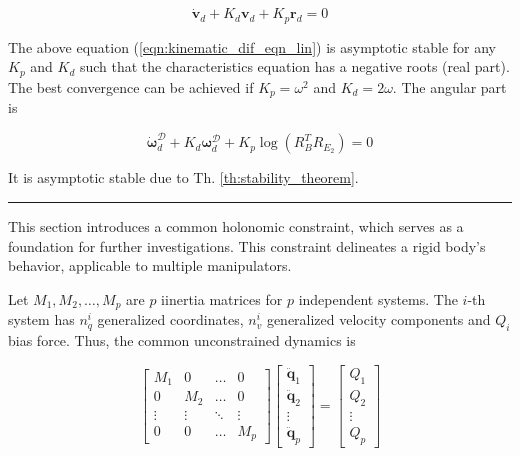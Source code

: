 \begin{equation}
    \dot{\mathbf{v}}_d + K_d \mathbf{v}_d + K_p \mathbf{r}_d = 0
    \label{eqn:kinematic_dif_eqn_lin}
\end{equation}

The above equation (\ref{eqn:kinematic_dif_eqn_lin}) is asymptotic stable for any 
$K_p$ and $K_d$ such that the characteristics equation has a negative roots 
(real part). The best convergence can be achieved if $K_p = \omega^2$ and 
$K_d = 2 \omega$. The angular part is 

\begin{equation}
    \dot{\boldsymbol{\omega}}_d^{\mathcal{D}} + 
    K_d \boldsymbol{\omega}_d^{\mathcal{D}} + 
    K_p \log (R_B^T R_{E_2}) = 0
    \label{eqn:kinematic_dif_eqn_ang}
\end{equation}

It is asymptotic stable due to Th. \ref{th:stability_theorem}.

\noindent\rule{\textwidth}{1pt}

This section introduces a common holonomic constraint, which serves as a foundation 
for further investigations. This constraint delineates a rigid body's behavior, 
applicable to multiple manipulators.

Let $M_1, M_2, \dots, M_p$ are $p$ iinertia matrices for $p$ independent systems. 
The $i$-th system has $n_q^i$ generalized coordinates, $n_v^i$ generalized velocity 
components and $Q_i$ bias force. Thus, the common unconstrained dynamics is

\begin{equation}
    \label{eqn:common_dynamics}
    \begin{bmatrix}
        M_1 & 0   & \dots & 0 \\
        0   & M_2 & \dots & 0 \\
        \vdots & \vdots & \ddots & \vdots \\
        0   & 0   & \dots & M_p
    \end{bmatrix}
    \begin{bmatrix}
        \ddot{\mathbf{q}}_1 \\ \ddot{\mathbf{q}}_2 \\ \vdots \\ \ddot{\mathbf{q}}_p
    \end{bmatrix}
    = 
    \begin{bmatrix}
        Q_1 \\ Q_2 \\ \vdots \\ Q_p
    \end{bmatrix}
\end{equation}

